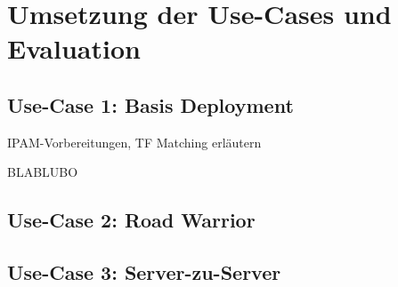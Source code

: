 \chapter{Umsetzung der Use-Cases und Evaluation} \label{Umsetzung der Use-Cases und Evaluation}

\section{Use-Case 1: Basis Deployment} \label{Basis Deployment}

IPAM-Vorbereitungen, TF Matching erläutern

BLABLUBO


\section{Use-Case 2: Road Warrior} \label{Use-Case 1: Road Warrior}

\section{Use-Case 3: Server-zu-Server} \label{Use-Case 2: Server-zu-Server}

